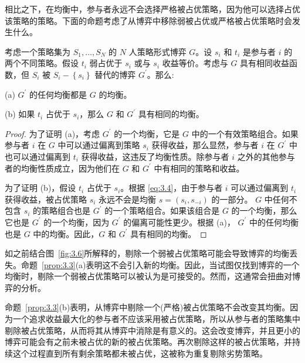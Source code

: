相比之下，在均衡中，参与者永远不会选择严格被占优策略，因为他可以选择占优该策略的策略。下面的命题考虑了从博弈中移除弱被占优或严格被占优策略时会发生什么。

\begin{proposition}\label{prop:3.3}
    考虑一个策略集为 \({S}_{1},\ldots,{S}_{N}\) 的 \(N\) 人策略形式博弈 \(G\)。设 \({s}_{i}\) 和 \({t}_{i}\) 是参与者 \(i\) 的两个不同策略。假设 \({t}_{i}\) 弱占优于 \({s}_{i}\) 或与 \({s}_{i}\) 收益等价。考虑与 \(G\) 具有相同收益函数，但 \({S}_{i}\) 被 \({S}_{i} - \left\{  {s}_{i}\right\}\) 替代的博弈 \({G}^{\prime }\)。那么:

(a) \({G}^{\prime }\) 的任何均衡都是 \(G\) 的均衡。

(b) 如果 \({t}_{i}\) 占优于 \({s}_{i}\)，那么 \(G\) 和 \({G}^{\prime }\) 具有相同的均衡。

\end{proposition}

\begin{proof}
    为了证明 (a)，考虑 \({G}^{\prime }\) 的一个均衡，它是 \(G\) 中的一个有效策略组合。如果参与者 \(i\) 在 \(G\) 中可以通过偏离到策略 \({s}_{i}\) 获得收益，那么显然，参与者 \(i\) 在 \({G}^{\prime }\) 中也可以通过偏离到 \({t}_{i}\) 获得收益，这违反了均衡性质。除参与者 \(i\) 之外的其他参与者的均衡性质成立，因为他们在 \(G\) 和 \({G}^{\prime }\) 中有相同的策略和收益。

为了证明 (b)，假设 \({t}_{i}\) 占优于 \({s}_{i}\)。根据 \eqref{eq:3.4}，由于参与者 \(i\) 可以通过偏离到 \({t}_{i}\) 获得收益，被占优策略 \({s}_{i}\) 永远不会是均衡 \(s = \left( {{s}_{i},{s}_{-i}}\right)\) 的一部分。 \(G\) 中任何不包含 \({s}_{i}\) 的策略组合也是 \({G}^{\prime }\) 的一个策略组合。如果该组合是 \(G\) 的一个均衡，那么它也是 \({G}^{\prime }\) 的一个均衡，因为 \({G}^{\prime }\) 的偏离可能性更少。根据 (a)， \({G}^{\prime }\) 中的任何均衡也是 \(G\) 中的均衡。因此，\(G\) 和 \({G}^{\prime }\) 具有相同的均衡。
\end{proof}


如之前结合图~\ref{fig:3.6}所解释的，剔除一个弱被占优策略可能会导致博弈的均衡丢失。命题~\ref{prop:3.3}(a)表明这不会引入新的均衡。因此，当试图仅找到博弈的一个均衡时，剔除一个弱被占优策略可以被认为是可接受的。然而，这通常会扭曲对博弈的分析。

命题~\ref{prop:3.3}(b)表明，从博弈中剔除一个(严格)被占优策略不会改变其均衡。因为一个追求收益最大化的参与者不应该采用被占优策略，所以从参与者的策略集中剔除被占优策略，从而将其从博弈中消除是有意义的。这会改变博弈，并且更小的博弈可能会有之前未被占优的新的被占优策略。再次剔除这样的被占优策略，并持续这个过程直到所有剩余策略都未被占优，这被称为重复剔除劣势策略。

